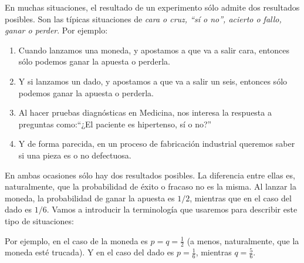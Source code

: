 En muchas situaciones, el resultado de un experimento sólo admite dos resultados posibles. Son las típicas situaciones de {\em cara o cruz, ``sí o no'', acierto o fallo, ganar o perder}.
Por ejemplo:
    \begin{enumerate}
            \item Cuando lanzamos una moneda, y apostamos a que va a salir cara, entonces sólo podemos ganar la apuesta o perderla.
            \item Y si lanzamos un dado, y apostamos a que va a salir un seis, entonces sólo podemos ganar la apuesta o perderla.
            \item Al hacer pruebas diagnósticas en Medicina, nos interesa la respuesta a preguntas como:``¿El paciente es hipertenso, sí o no?''
            \item Y de forma parecida, en un proceso de fabricación industrial queremos saber si una pieza es o no defectuosa.
    \end{enumerate}
En ambas ocasiones sólo hay dos resultados posibles. La diferencia entre ellas es, naturalmente,  que la probabilidad de éxito o fracaso no es la misma. Al lanzar la moneda, la probabilidad de ganar la apuesta es $1/2$, mientras que en el caso del dado es $1/6$. Vamos a introducir la terminología que usaremos para describir este tipo de situaciones:
    \begin{center}
    \end{center}
Por ejemplo, en el caso de la moneda es $p=q=\frac{1}{2}$ (a menos, naturalmente, que la moneda esté trucada). Y en el caso del dado es $p=\frac{1}{6}$, mientras $q=\frac{5}{6}$.

